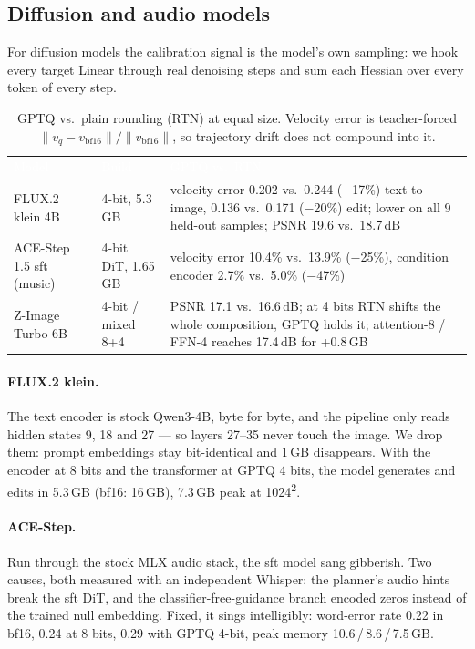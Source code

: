 \documentclass[10pt,letterpaper]{article}
\newcommand{\hd}[1]{\textcolor{white}{\interbold #1}}
\begin{document}
\subsection{Diffusion and audio models}

For diffusion models the calibration signal is the model's own sampling: we hook every target Linear through real denoising steps and sum each Hessian over every token of every step.

\begin{table}[H]
\centering\small
\caption{GPTQ vs.\ plain rounding (RTN) at equal size. Velocity error is teacher-forced $\lVert v_q-v_{\text{bf16}}\rVert/\lVert v_{\text{bf16}}\rVert$, so trajectory drift does not compound into it.}
\begin{tabularx}{\linewidth}{>{\raggedright\arraybackslash}p{1.35in}lL}
\hd{Model} & \hd{Build} & \hd{GPTQ vs.\ RTN}\\
FLUX.2 klein 4B & 4-bit, 5.3\,GB & velocity error 0.202 vs.\ 0.244 (−17\%) text-to-image, 0.136 vs.\ 0.171 (−20\%) edit; lower on all 9 held-out samples; PSNR 19.6 vs.\ 18.7\,dB\\
ACE-Step 1.5 sft (music) & 4-bit DiT, 1.65\,GB & velocity error 10.4\% vs.\ 13.9\% (−25\%), condition encoder 2.7\% vs.\ 5.0\% (−47\%)\\
Z-Image Turbo 6B & 4-bit / mixed 8+4 & PSNR 17.1 vs.\ 16.6\,dB; at 4 bits RTN shifts the whole composition, GPTQ holds it; attention-8 / FFN-4 reaches 17.4\,dB for +0.8\,GB\\
\end{tabularx}
\end{table}

\paragraph{FLUX.2 klein.} The text encoder is stock Qwen3-4B, byte for byte, and the pipeline only reads hidden states 9, 18 and 27 --- so layers 27--35 never touch the image. We drop them: prompt embeddings stay bit-identical and 1\,GB disappears. With the encoder at 8 bits and the transformer at GPTQ 4 bits, the model generates and edits in 5.3\,GB (bf16: 16\,GB), 7.3\,GB peak at 1024\textsuperscript{2}.

\paragraph{ACE-Step.} Run through the stock MLX audio stack, the sft model sang gibberish. Two causes, both measured with an independent Whisper: the planner's audio hints break the sft DiT, and the classifier-free-guidance branch encoded zeros instead of the trained null embedding. Fixed, it sings intelligibly: word-error rate 0.22 in bf16, 0.24 at 8 bits, 0.29 with GPTQ 4-bit, peak memory 10.6\,/\,8.6\,/\,7.5\,GB.
\end{document}
